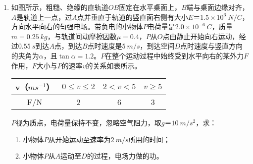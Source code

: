 \begin{enumerate}[leftmargin=0em]
\newpage 
\item
{}
如图所示，粗糙、绝缘的直轨道$ OB $固定在水平桌面上，$ B $端与桌面边缘对齐，$ A $是轨道上一点，过$ A $点并垂直于轨道的竖直面右侧有大小$ E $＝$ 1.5 \times 10^6 \ N/C $，方向水平向右的匀强电场。带负电的小物体$ P $电荷量是$ 2.0 \times 10^{-6}\ C $，质量$ m = 0.25 \ kg $，与轨道间动摩擦因数$ \mu =0.4 $，$ P $从$ O $点由静止开始向右运动，经过$ 0.55 \ s $到达$ A $点，到达$ B $点时速度是$ 5 \ m/s $，到达空间$ D $点时速度与竖直方向的夹角为$ \alpha $，且$ \tan \alpha = 1.2 $。$ P $在整个运动过程中始终受到水平向右的某外力$ F $作用，$ F $大小与$ P $的速率$ v $的关系如表所示。
\begin{table}[h!]
\centering 
\begin{tabular}{|c|c|c|c|}
\hline 
v（$ ms^{-1} $） &$ 0\leq v \leq 2 $&$ 2<v<5 $ &$ v\geq 5 $ \\
\hline
F/N & 2 & 6 & 3\\ 
\hline 
\end{tabular}
\end{table} 

$ P $视为质点，电荷量保持不变，忽略空气阻力，取$ g $＝$ 10 \ m/s ^{2} $，求：
\begin{enumerate}
\renewcommand{\labelenumi}{\arabic{enumi}.}
\item
小物体$ P $从开始运动至速率为$ 2 \ m/s $所用的时间；
\item 
小物体$ P $从$ A $运动至$ D $的过程，电场力做的功。


\end{enumerate}
\begin{figure}[h!]
\flushright

\end{figure}




\end{enumerate}
